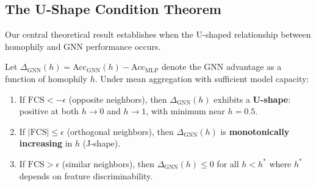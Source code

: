 \subsection{The U-Shape Condition Theorem}

Our central theoretical result establishes when the U-shaped relationship between homophily and GNN performance occurs.

\begin{theorem}
\label{thm:ushape_condition}
Let $\Delta_{\text{GNN}}(h) = \text{Acc}_{\text{GNN}}(h) - \text{Acc}_{\text{MLP}}$ denote the GNN advantage as a function of homophily $h$. Under mean aggregation with sufficient model capacity:

\begin{enumerate}
    \item If $\text{FCS} < -\epsilon$ (opposite neighbors), then $\Delta_{\text{GNN}}(h)$ exhibits a \textbf{U-shape}: positive at both $h \to 0$ and $h \to 1$, with minimum near $h = 0.5$.

    \item If $|\text{FCS}| \leq \epsilon$ (orthogonal neighbors), then $\Delta_{\text{GNN}}(h)$ is \textbf{monotonically increasing} in $h$ (J-shape).

    \item If $\text{FCS} > \epsilon$ (similar neighbors), then $\Delta_{\text{GNN}}(h) \leq 0$ for all $h < h^*$ where $h^*$ depends on feature discriminability.
\end{enumerate}
\end{theorem}

